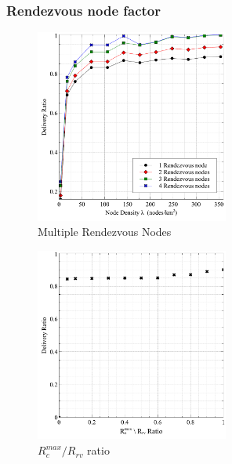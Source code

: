 \documentclass[conference]{IEEEtran}
\begin{document}

\subsubsection{Rendezvous node factor}
\begin{figure}[!t]
	\centering
	\includegraphics[width=2.5in]{Graphs/MultipleRVs.pdf}
	\caption{Multiple Rendezvous Nodes}
	\label{Multiple Rendezvous Nodes}
\end{figure}
\begin{figure}[!t]
\centering
\includegraphics[width=2.5in]{Graphs/RcmaxRrv.pdf}
\caption{$R_c^{max}/R_{rv}$ ratio}
\label{$R_c^{max}/R_{rv}$ ratio}
\end{figure}
\end{document}
